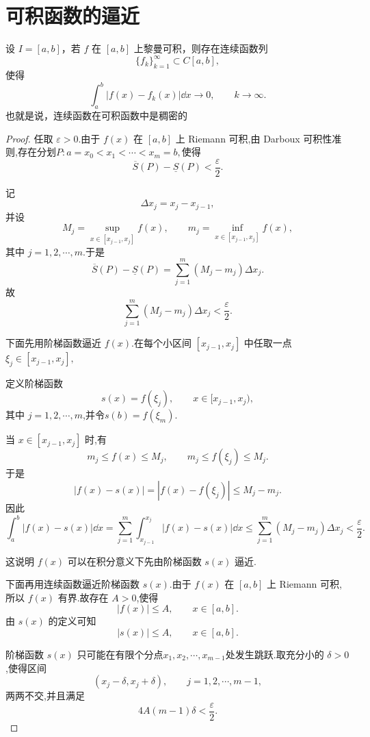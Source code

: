 \section{可积函数的逼近}
\begin{theorem}
	设 $I=[a,b]$，若 $f$ 在 $[a,b]$ 上黎曼可积，则存在连续函数列
	\[
	\{f_k\}_{k=1}^{\infty}\subset C[a,b],
	\]
	使得
	\[
	\int_a^b |f(x)-f_k(x)|\dd x\to 0,
	\qquad k\to\infty.
	\]
	也就是说，连续函数在可积函数中是稠密的
\end{theorem}

\begin{proof}

		任取 $\varepsilon>0$.由于 $f(x)$ 在 $[a,b]$ 上 Riemann 可积,由 Darboux 可积性准则,存在分划$P:a=x_0<x_1<\cdots<x_m=b,$使得
		\[
		\overline{S}(P)-\underline{S}(P)<\frac{\varepsilon}{2}.
		\]
		
		记
		\[
		\Delta x_j=x_j-x_{j-1},
		\]
		并设
		\[
		M_j=\sup_{x\in[x_{j-1},x_j]}f(x),
		\qquad
		m_j=\inf_{x\in[x_{j-1},x_j]}f(x),
		\]
		其中 $j=1,2,\cdots,m$.于是
		\[
		\overline{S}(P)-\underline{S}(P)
		=
		\sum_{j=1}^{m}(M_j-m_j)\Delta x_j.
		\]
		故
		\[
		\sum_{j=1}^{m}(M_j-m_j)\Delta x_j<\frac{\varepsilon}{2}.
		\]
		
		下面先用阶梯函数逼近 $f(x)$.在每个小区间 $[x_{j-1},x_j]$ 中任取一点$\xi_j\in[x_{j-1},x_j],$
	
		定义阶梯函数
		\[
		s(x)=f(\xi_j),\qquad x\in[x_{j-1},x_j),
		\]
		其中 $j=1,2,\cdots,m$,并令$s(b)=f(\xi_m).$
	
		当 $x\in[x_{j-1},x_j]$ 时,有
		\[
		m_j\leq f(x)\leq M_j,
		\qquad
		m_j\leq f(\xi_j)\leq M_j.
		\]
		于是
		\[
		|f(x)-s(x)|
		=
		|f(x)-f(\xi_j)|
		\leq M_j-m_j.
		\]
		因此
		\[\int_a^b |f(x)-s(x)|\dd x
			=
			\sum_{j=1}^{m}\int_{x_{j-1}}^{x_j}|f(x)-s(x)|\dd x\leq
			\sum_{j=1}^{m}(M_j-m_j)\Delta x_j
			<
			\frac{\varepsilon}{2}.
		\]
		
		这说明 $f(x)$ 可以在积分意义下先由阶梯函数 $s(x)$ 逼近.
		
		下面再用连续函数逼近阶梯函数 $s(x)$.由于 $f(x)$ 在 $[a,b]$ 上 Riemann 可积,所以 $f(x)$ 有界.故存在 $A>0$,使得
		\[
		|f(x)|\leq A,\qquad x\in[a,b].
		\]
		由 $s(x)$ 的定义可知
		\[
		|s(x)|\leq A,\qquad x\in[a,b].
		\]
		
		阶梯函数 $s(x)$ 只可能在有限个分点$x_1,x_2,\cdots,x_{m-1}$处发生跳跃.取充分小的 $\delta>0$,使得区间
		\[
		(x_j-\delta,x_j+\delta),
		\qquad j=1,2,\cdots,m-1,
		\]
		两两不交,并且满足
		\[
		4A(m-1)\delta<\frac{\varepsilon}{2}.
		\]
		

\end{proof}
